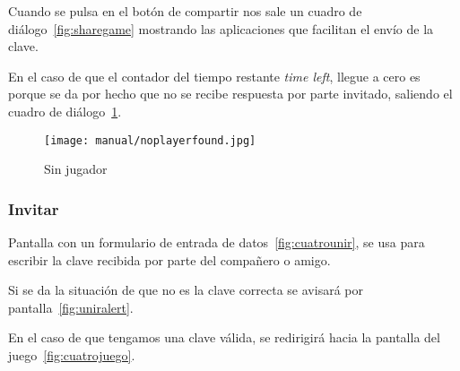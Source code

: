 Cuando se pulsa en el botón de compartir nos sale un cuadro de diálogo~\ref{fig:sharegame} mostrando las aplicaciones que facilitan el envío de la clave.

En el caso de que el contador del tiempo restante \emph{time left}, llegue a cero es porque se da por hecho que no se recibe respuesta por parte invitado, saliendo el cuadro de diálogo~\ref{fig:noplayerfound}.

\begin{figure}[H]
	\centering
	\texttt{[image: manual/noplayerfound.jpg]}
	\caption{Sin jugador}\label{fig:noplayerfound}
\end{figure}

\subsubsection{Invitar}\label{cuatrounir}
Pantalla con un formulario de entrada de datos~\ref{fig:cuatrounir}, se usa para escribir la clave recibida por parte del compañero o amigo. 

Si se da la situación de que no es la clave correcta se avisará por pantalla~\ref{fig:uniralert}.

En el caso de que tengamos una clave válida, se redirigirá hacia la pantalla del juego~\ref{fig:cuatrojuego}.